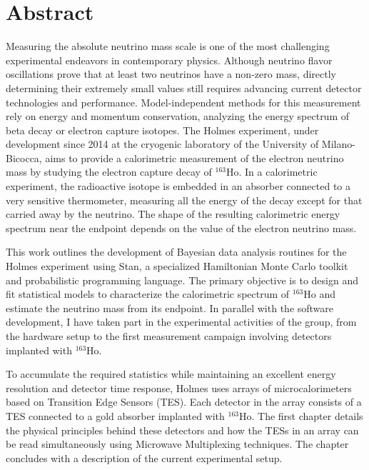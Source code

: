 
\chapter*{Abstract}
Measuring the absolute neutrino mass scale is one of the most challenging experimental endeavors in contemporary physics. Although neutrino flavor oscillations prove that at least two neutrinos have a non-zero mass, directly determining their extremely small values still requires advancing current detector technologies and performance. Model-independent methods for this measurement rely on energy and momentum conservation, analyzing the energy spectrum of beta decay or electron capture isotopes. The Holmes experiment, under development since 2014 at the cryogenic laboratory of the University of Milano-Bicocca, aims to provide a calorimetric measurement of the electron neutrino mass by studying the electron capture decay of \(^{163}\)Ho. In a calorimetric experiment, the radioactive isotope is embedded in an absorber connected to a very sensitive thermometer, measuring all the energy of the decay except for that carried away by the neutrino. The shape of the resulting calorimetric energy spectrum near the endpoint depends on the value of the electron neutrino mass.

This work outlines the development of Bayesian data analysis routines for the Holmes experiment using Stan, a specialized Hamiltonian Monte Carlo toolkit and probabilistic programming language. The primary objective is to design and fit statistical models to characterize the calorimetric spectrum of \(^{163}\)Ho and estimate the neutrino mass from its endpoint. In parallel with the software development, I have taken part in the experimental activities of the group, from the hardware setup to the first measurement campaign involving detectors implanted with \(^{163}\)Ho.

To accumulate the required statistics while maintaining an excellent energy resolution and detector time response,
Holmes uses arrays of microcalorimeters based on Transition Edge Sensors (TES). Each detector in the array consists of a
TES connected to a gold absorber implanted with \(^{163}\)Ho. The first chapter details the physical principles behind
these detectors and how the TESs in an array can be read simultaneously using Microwave Multiplexing techniques. The chapter concludes with a description of the current experimental setup.

